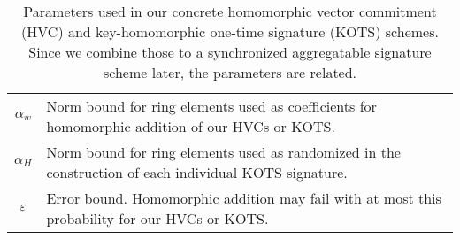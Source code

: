 \begin{table}
\begin{tabular}{c@{\hskip 2ex}l}
 $\alpha_w$ & Norm bound for ring elements used as coefficients for homomorphic addition of our HVCs or KOTS.\\
 $\alpha_H$ & Norm bound for ring elements used as randomized in the construction of each individual KOTS signature.\\
  $\varepsilon$ & Error bound. Homomorphic addition may fail with at most this probability for our HVCs or KOTS.\\
\end{tabular}
\medskip %
 \caption{Parameters used in our concrete homomorphic vector commitment (HVC) and key-homomorphic one-time signature (KOTS) schemes. Since we combine those to a synchronized aggregatable signature scheme later, the parameters are related.\label{table:meaning_of_parameters}}
\end{table}


